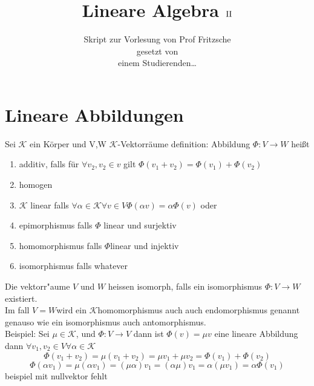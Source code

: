 \documentclass[11pt]{article}
\title{\textbf{Lineare Algebra $\RN{2}$}}
\author{Skript zur Vorlesung von Prof Fritzsche\\
		gesetzt von \\
	einem Studierenden\dots}
\date{}
\begin{document}
\maketitle

\section{Lineare Abbildungen}
Sei $\mathcal{K}$ ein  Körper und V,W $\mathcal{K}$-Vektorräume
definition: Abbildung $\Phi : V \rightarrow W$ heißt 
\begin{enumerate}
 \item additiv, falls für $ \forall v_2, v_2 \in v$ gilt $\Phi(v_1+v_2)=\Phi(v_1)+\Phi(v_2)$
 \item homogen
 \item $\mathcal{K}$ linear falls $ \forall \alpha \in \mathcal{K} \forall v \in V \Phi (\alpha v)= \alpha\Phi (v)$ oder 
 \item epimorphismus falls $\Phi$ linear und surjektiv
 \item homomorphismus falls $\Phi $linear und injektiv
 \item isomorphismus falls whatever
\end{enumerate}

Die  vektorr"aume $V$ und $W$ heissen isomorph, falls ein isomorphismus $\Phi : V \rightarrow W$ existiert.\\
Im fall $V=W $wird ein $\mathcal{K}$homomorphismus auch auch endomorphismus genannt genauso wie ein isomorphismus auch antomorphismus.\\
Beispiel: Sei $\mu \in \mathcal{K}$, und $\Phi  : V \rightarrow V$ dann ist $\Phi (v) = \mu v$ eine lineare Abbildung dann 
$\forall v_1, v_2 \in V \forall \alpha \in \mathcal{K}$    
\[
  \Phi(v_1+v_2)= \mu (v_1+v_2)= \mu v_1 + \mu v_2= \Phi(v_1)+\Phi(v_2)
\]
\[
  \Phi(\alpha v_1)=\mu  (\alpha v_1)= (\mu \alpha)v_1=(\alpha \mu )v_1= \alpha(\mu v_1)= \alpha\Phi(v_1)
\]
beispiel mit nullvektor fehlt
\end{document}

